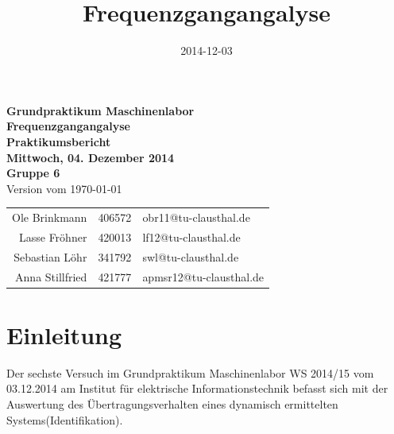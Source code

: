 \documentclass[a4paper,12pt]{scrartcl}
\title{Frequenzgangangalyse}
\date{2014-12-03}
\newcommand{\Revision}{}
\begin{document}
\thispagestyle{empty}
\begin{center}
\vspace*{20mm}

\Large
\textbf{Grundpraktikum Maschinenlabor} \\
\vspace{10mm}
\Huge
\textbf{\textsf{Frequenzgangangalyse}} \\
\vspace{10mm}
\large
\textbf{\textsf{Praktikumsbericht}} \\
\textbf{\textsf{Mittwoch, 04. Dezember 2014}} \\
\textbf{\textsf{Gruppe 6}} \\
\ifnum{}
	\textsf{\textcolor{footer-gray}{Version \textit{\Revision} vom \today}} \\
\fi

\vspace{40mm}
\begin{tabular}{rcl}
Ole Brinkmann & 406572 & obr11@tu-clausthal.de \\[4mm]
Lasse Fröhner & 420013 & lf12@tu-clausthal.de \\[4mm]
Sebastian Löhr & 341792 & swl@tu-clausthal.de \\[4mm]
Anna Stillfried & 421777 & apmsr12@tu-clausthal.de \\[4mm]
\end{tabular}

\end{center}

\pagebreak
\restoregeometry

\tableofcontents
\newpage


\section{Einleitung}
Der sechste Versuch im Grundpraktikum Maschinenlabor WS 2014/15 vom 03.12.2014 am Institut für elektrische Informationstechnik befasst sich mit der Auswertung des Übertragungsverhalten eines dynamisch ermittelten Systems(Identifikation).
\end{document}
